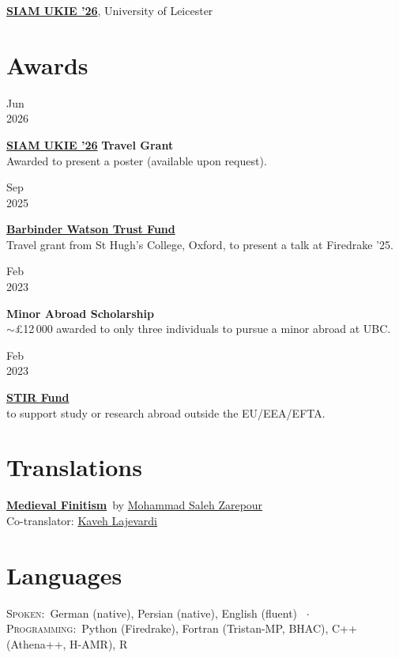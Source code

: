 \documentclass[a4paper,10pt]{article}
\renewcommand{\normalsize}{\fontsize{13}{13}\selectfont}
\renewcommand{\small}{\fontsize{12.5}{12.5}\selectfont}
\newcommand{\disstitle}[1]{{\scshape\normalsize\textcolor{brick}{#1}}}
\newcommand{\skillrow}[2]{%
  \disstitle{#1}\textcolor{brick}{:}\ {\small #2}%
}
\newlength{\datewidth}
\newlength{\pubwidth}
\newcommand{\pubentry}[3]{%
  \vspace{2pt}%
  \begin{minipage}[t]{\datewidth}
    \raggedleft #1\\#2
  \end{minipage}%
  \hspace{0.4cm}%
  \begin{minipage}[t]{\pubwidth}
    #3
  \end{minipage}%
  \vspace{2pt}%
}
\newcommand{\pubtitle}[1]{\textbf{\textcolor{pubcol}{#1}}}
\newcommand{\yearentry}[2]{%
  \vspace{2pt}%
  \begin{minipage}[t]{\datewidth}
    \raggedleft #1
  \end{minipage}%
  \hspace{0.4cm}%
  \begin{minipage}[t]{\pubwidth}
    #2
  \end{minipage}%
  \vspace{2pt}%
}
\begin{document}
\vspace{2pt}
\yearentry{2026}{%
  \href{https://sites.google.com/view/siamukie26/home}{\pubtitle{SIAM UKIE '26}}, University of Leicester%
}

\section*{Awards}

\pubentry{Jun}{2026}{%
  \pubtitle{\href{https://sites.google.com/view/siamukie26/home}{SIAM UKIE '26}} \textbf{Travel Grant}\\[2pt]
  {\small Awarded to present a poster (available upon request).}%
}

\vspace{3pt}
\pubentry{Sep}{2025}{%
  \pubtitle{\href{https://www.st-hughs.ox.ac.uk/current-students/finance/financial-grants/the-barbinder-watson-trust-fund/}{Barbinder Watson Trust Fund}}\\[2pt]
  {\small Travel grant from St Hugh's College, Oxford, to present a talk at Firedrake '25.}%
}

\vspace{3pt}
\pubentry{Feb}{2023}{%
  \textbf{Minor Abroad Scholarship}\\[2pt]
  {\small \(\sim\)\pounds12\,000 awarded to only three individuals to pursue a minor abroad at UBC.}%
}

\vspace{3pt}
\pubentry{Feb}{2023}{%
  \pubtitle{\href{https://www.tudelft.nl/studenten/mijn-studie-ik/onderwijs/study-abroad/orientation/financial-support/stir-fund}{STIR Fund}}\\[2pt]
  {\small \texteuro400 to support study or research abroad outside the EU/EEA/EFTA.}%
}

\section*{Translations}

\yearentry{2026}{%
  \pubtitle{\href{https://www.cambridge.org/core/elements/abs/medieval-finitism/DF1200CCF8D885032E251462187EEB8D}{Medieval Finitism}}\ {\small by \textcolor{linkcol}{\href{https://www.ms-zarepour.com/}{Mohammad Saleh Zarepour}}}\\[2pt]
  {\small\textcolor{muted}{Co-translator:} \textcolor{linkcol}{\href{https://www.kaavelajevardi.com/}{Kaveh Lajevardi}}}%
}


\section*{Languages}

\skillrow{Spoken}{German (native), Persian (native), English (fluent)}\ \(\cdot\)\ \skillrow{Programming}{Python (Firedrake), Fortran (Tristan-MP, BHAC), C++ (Athena++, H-AMR), R}
\end{document}
